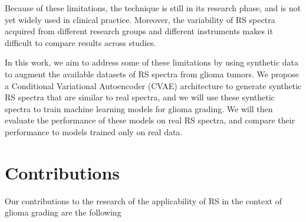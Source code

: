 Because of these limitations, the technique is still in its research phase, and is not yet widely used in clinical practice. Moreover, the variability of RS spectra acquired from different research groups and different instruments makes it difficult to compare results across studies.

In this work, we aim to address some of these limitations by using synthetic data to augment the available datasets of RS spectra from glioma tumors. We propose a Conditional Variational Autoencoder (CVAE) architecture to generate synthetic RS spectra that are similar to real spectra, and we will use these synthetic spectra to train machine learning models for glioma grading. We will then evaluate the performance of these models on real RS spectra, and compare their performance to models trained only on real data.

\section*{Contributions}



Our contributions to the research of the applicability of RS in the context of glioma grading are the following

